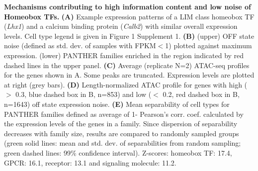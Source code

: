 \textbf{Mechanisms contributing to high information content and low noise of Homeobox TFs.}
\textbf{(A)} Example expression patterns of a LIM class homeobox TF (\textit{Lhx1}) and a calcium binding protein (\textit{Calb2}) with  similar overall expression levels. Cell type legend is given in Figure 1 Supplement 1.
\textbf{(B)} (upper) OFF state noise (defined as std. dev. of samples with FPKM$<$1) plotted against maximum expression. (lower) PANTHER families enriched in the region indicated by red dashed lines in the upper panel.
\textbf{(C)} Average (replicate N=2) ATAC-seq profiles for the genes shown in A. Some peaks are truncated. Expression levels are plotted at right (grey bars).
\textbf{(D)} Length-normalized ATAC profile for genes with high ($>$ 0.3, blue dashed box in B, n=853) and low ($<$ 0.2, red dashed box in B, n=1643) off state expression noise.
\textbf{(E)} Mean separability of cell types for PANTHER families defined as average of 1- Pearson's corr. coef. calculated by the expression levels of the genes in a family. Since dispersion of separability decreases with family size, results are compared to randomly sampled groups (green solid lines: mean and std. dev. of separabilities from random sampling; green dashed lines: 99\% confidence interval). Z-scores: homeobox TF: 17.4, GPCR: 16.1, receptor: 13.1 and signaling molecule: 11.2. 
